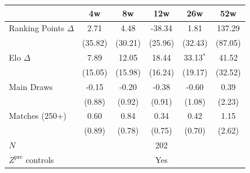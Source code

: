 \begin{tabular}{lccccc}
\toprule
 & 4w & 8w & 12w & 26w & 52w \\
\midrule
Ranking Points $\Delta$ & 2.71 & 4.48 & -38.34 & 1.81 & 137.29 \\
 & (35.82) & (30.21) & (25.96) & (32.43) & (87.05) \\[0.3em]
Elo $\Delta$ & 7.89 & 12.05 & 18.44 & 33.13$^{*}$ & 41.52 \\
 & (15.05) & (15.98) & (16.24) & (19.17) & (32.52) \\[0.3em]
Main Draws & -0.15 & -0.20 & -0.38 & -0.60 & 0.39 \\
 & (0.88) & (0.92) & (0.91) & (1.08) & (2.23) \\[0.3em]
Matches (250+) & 0.60 & 0.84 & 0.34 & 0.42 & 1.15 \\
 & (0.89) & (0.78) & (0.75) & (0.70) & (2.62) \\[0.3em]
\midrule
$N$ & \multicolumn{5}{c}{202} \\
$Z^{\text{pre}}$ controls & \multicolumn{5}{c}{Yes} \\
\bottomrule
\end{tabular}
